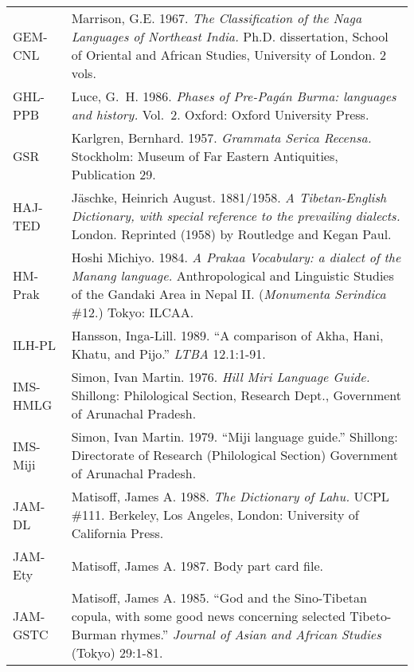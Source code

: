 {\begin{longtable}{l>{\hangindent=0.25in}p{5.6in}}
GEM-CNL &
Marrison, G.E.
1967.
\textit{The Classification of the Naga Languages of Northeast India.}
Ph.D. dissertation, School of Oriental and African Studies, University of London.  2 vols.
\\[0.8\parskip]

GHL-PPB &
Luce, G.~H.
1986.
\textit{Phases of Pre-Pagán Burma: languages and history.}
Vol.~2. Oxford: Oxford University Press.
\\[0.8\parskip]

GSR &
Karlgren, Bernhard.
1957.
\textit{Grammata Serica Recensa.}
Stockholm: Museum of Far Eastern Antiquities, Publication 29.
\\[0.8\parskip]

HAJ-TED &
Jäschke, Heinrich August.
1881/1958.
\textit{A Tibetan-English Dictionary, with special reference to the prevailing dialects.}
London. Reprinted (1958) by Routledge and Kegan Paul.
\\[0.8\parskip]

HM-Prak &
Hoshi Michiyo.
1984.
\textit{A Prakaa Vocabulary: a dialect of the Manang language.}
Anthropological and Linguistic Studies of the Gandaki Area in Nepal II.  (\textit{Monumenta Serindica} \#12.)  Tokyo: ILCAA.
\\[0.8\parskip]

ILH-PL &
Hansson, Inga-Lill.
1989.
“A comparison of Akha, Hani, Khatu, and Pijo.”
\textit{LTBA} 12.1:1-91.
\\[0.8\parskip]

IMS-HMLG &
Simon, Ivan Martin.
1976.
\textit{Hill Miri Language Guide.}
Shillong: Philological Section, Research Dept., Government of Arunachal Pradesh.
\\[0.8\parskip]

IMS-Miji &
Simon, Ivan Martin.
1979.
“Miji language guide.”
Shillong: Directorate of Research (Philological Section) Government of Arunachal Pradesh.
\\[0.8\parskip]

JAM-DL &
Matisoff, James A.
1988.
\textit{The Dictionary of Lahu.}
UCPL \#111.  Berkeley, Los Angeles, London: University of California Press.
\\[0.8\parskip]

JAM-Ety &
Matisoff, James A.
1987.
Body part card file.
\\[0.8\parskip]

JAM-GSTC &
Matisoff, James A.
1985.
“God and the Sino-Tibetan copula, with some good news concerning selected Tibeto-Burman rhymes.”
\textit{Journal of Asian and African Studies} (Tokyo) 29:1-81.
\\[0.8\parskip]


\end{longtable}}
